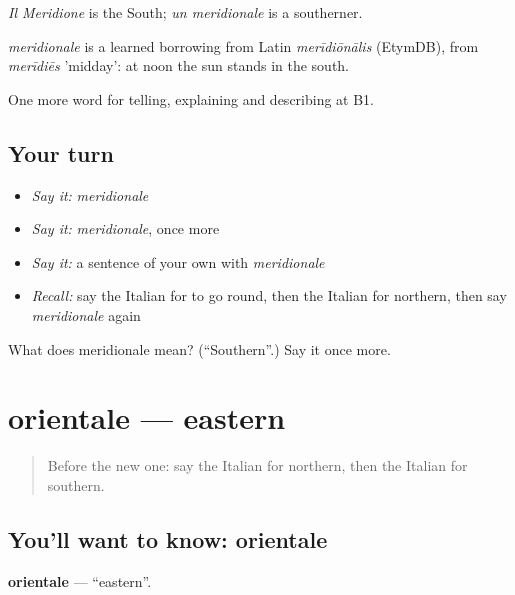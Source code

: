 \emph{Il Meridione} is the South; \emph{un meridionale} is a southerner.

\begin{cousinweb}
\emph{meridionale} is a learned borrowing from Latin \emph{merīdiōnālis} (EtymDB), from \emph{merīdiēs} 'midday': at noon the sun stands in the south.
\end{cousinweb}

\begin{grammarlens}[title={What you've built}]
One more word for telling, explaining and describing at B1.
\end{grammarlens}

\subsection*{Your turn}
\begin{itemize}
\raggedright
  \item \emph{Say it:} \emph{meridionale}
  \item \emph{Say it:} \emph{meridionale}, once more
  \item \emph{Say it:} a sentence of your own with \emph{meridionale}
  \item \emph{Recall:} say the Italian for to go round, then the Italian for northern, then say \emph{meridionale} again
\end{itemize}

\begin{tcolorbox}[breakable,colback=teal!4,colframe=teal!35!black,title={Before you move on}]
What does meridionale mean? (\textquotedblleft{}Southern\textquotedblright{}.) Say it once more.
\end{tcolorbox}
\section[orientale]{orientale — eastern}

\label{lesson:IT-C443-orientale}



\begin{quote}
Before the new one: say the Italian for northern, then the Italian for southern.
\end{quote}

\subsection*{You'll want to know: orientale}
\textbf{orientale} — \textquotedblleft{}eastern\textquotedblright{}.

